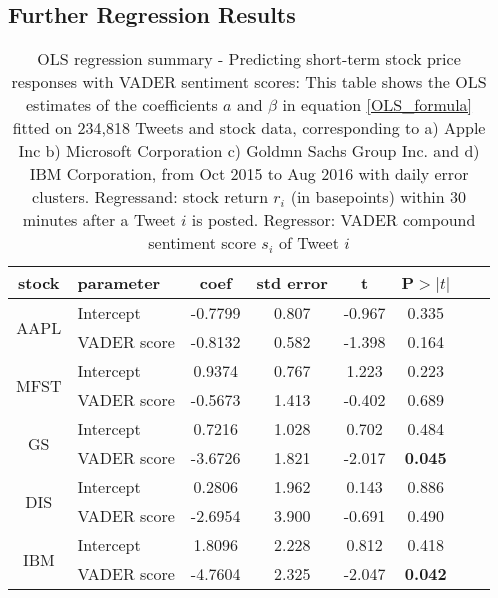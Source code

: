 \documentclass[a4paper,12pt]{article}%
\begin{document}
\subsection{Further Regression Results}
%
\begin{table}[H]
\centering
\captionsetup{justification=centering}
\begin{tabularx}{0.71\textwidth}{c|l|cccccc}
 stock & parameter & coef & std error & t & P$>|t|$\\ \hline

\multirow{2}{*}{AAPL} & Intercept    &      -0.7799  &        0.807     &    -0.967  &         0.335   \\
& VADER score &      -0.8132  &        0.582     &    -1.398  &         0.164    \\ \hline

\multirow{2}{*}{MFST} & Intercept     &       0.9374  &        0.767     &     1.223  &         0.223  \\
& VADER score &      -0.5673  &        1.413     &    -0.402  &         0.689 \\ \hline

\multirow{2}{*}{GS} & Intercept      &       0.7216  &        1.028     &     0.702  &         0.484 \\
& VADER score &      -3.6726  &        1.821     &    -2.017  &         \textbf{0.045} \\ \hline

\multirow{2}{*}{DIS} & Intercept     &       0.2806  &        1.962     &     0.143  &         0.886 \\
& VADER score &      -2.6954  &        3.900     &    -0.691  &         0.490 \\ \hline

\multirow{2}{*}{IBM} & Intercept     &       1.8096  &        2.228     &     0.812  &         0.418  \\
& VADER score &      -4.7604  &        2.325     &    -2.047  &        \textbf{0.042 }  \\ \hline

\end{tabularx}
\caption[Regression Summary 30 Minute Returns and Tweet Sentiment of Selected Stocks]{OLS regression summary - Predicting short-term stock price responses with VADER sentiment scores: This table shows the OLS estimates of the coefficients $a$ and $\beta$ in equation \ref{OLS_formula} fitted on 234,818 Tweets and stock data, corresponding to a) Apple Inc b) Microsoft Corporation c) Goldmn Sachs Group Inc. and d) IBM Corporation, from Oct 2015 to Aug 2016 with daily error clusters. Regressand: stock return $r_i$ (in basepoints) within 30 minutes after a Tweet $i$ is posted. Regressor: VADER compound sentiment score $s_i$ of Tweet $i$ \label{vader_short_term_30min_firms}}
\end{table}
\end{document}
